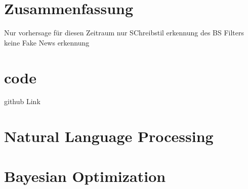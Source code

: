 \chapter{Zusammenfassung}
Nur vorhersage für diesen Zeitraum
nur SChreibstil erkennung des BS Filters keine Fake News erkennung 


\chapter{code}
github Link

\appendix
\chapter{Natural Language Processing}
\label{sec:NLP}

\chapter{Bayesian Optimization}
\label{sec:TPE}
